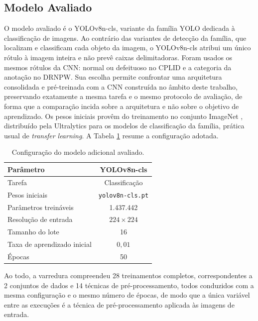 \subsection{Modelo Avaliado}

O modelo avaliado é o YOLOv8n-cls, variante da família YOLO dedicada à classificação de imagens. Ao contrário das variantes de detecção da família, que localizam e classificam cada objeto da imagem, o YOLOv8n-cls atribui um único rótulo à imagem inteira e não prevê caixas delimitadoras. Foram usados os mesmos rótulos da CNN: normal ou defeituoso no CPLID e a categoria da anotação no DRNPW. Sua escolha permite confrontar uma arquitetura consolidada e pré-treinada com a CNN construída no âmbito deste trabalho, preservando exatamente a mesma tarefa e o mesmo protocolo de avaliação, de forma que a comparação incida sobre a arquitetura e não sobre o objetivo de aprendizado. Os pesos iniciais provêm do treinamento no conjunto ImageNet \cite{deng2009imagenet}, distribuído pela Ultralytics para os modelos de classificação da família, prática usual de \textit{transfer learning}. A Tabela \ref{tab:yolo_config} resume a configuração adotada.

\begin{table}[H]
    \centering
    \caption{\label{tab:yolo_config}Configuração do modelo adicional avaliado.}
    \vspace{0.2cm}
    \small
    \begin{tabular}{lc}
        \hline
        \textbf{Parâmetro} & \textbf{YOLOv8n-cls} \\
        \hline
        Tarefa                      & Classificação \\
        Pesos iniciais              & \texttt{yolov8n-cls.pt} \\
        Parâmetros treináveis       & 1.437.442 \\
        Resolução de entrada        & $224 \times 224$ \\
        Tamanho do lote             & 16 \\
        Taxa de aprendizado inicial & $0{,}01$ \\
        Épocas                      & 50 \\
        \hline
    \end{tabular}
\end{table}

Ao todo, a varredura compreendeu 28 treinamentos completos, correspondentes a 2 conjuntos de dados e 14 técnicas de pré-processamento, todos conduzidos com a mesma configuração e o mesmo número de épocas, de modo que a única variável entre as execuções é a técnica de pré-processamento aplicada às imagens de entrada.

